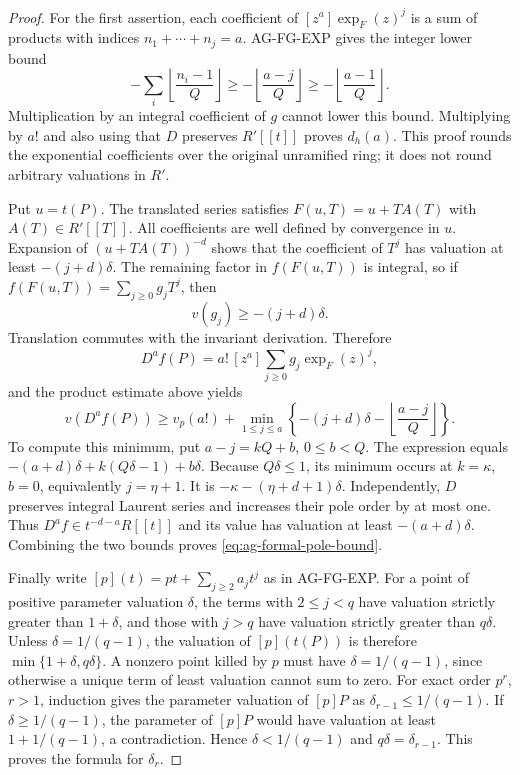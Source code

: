 \documentclass[11pt,a4paper]{article}
\begin{document}
\begin{proof}
For the first assertion, each coefficient of $[z^a]\exp_F(z)^j$
is a sum of products with indices $n_1+\cdots+n_j=a$.
AG-FG-EXP gives the integer lower bound
\[
 -\sum_i\left\lfloor\frac{n_i-1}{Q}\right\rfloor
 \ge-\left\lfloor\frac{a-j}{Q}\right\rfloor
 \ge-\left\lfloor\frac{a-1}{Q}\right\rfloor.
\]
Multiplication by an integral coefficient of $g$ cannot lower
this bound. Multiplying by $a!$ and also using that $D$ preserves
$R'[[t]]$ proves $d_h(a)$. This proof rounds the exponential
coefficients over the original unramified ring; it does not round
arbitrary valuations in $R'$.

Put $u=t(P)$. The translated series satisfies
$F(u,T)=u+T A(T)$ with $A(T)\in R'[[T]]$.
All coefficients are well defined by convergence in $u$.
Expansion of $(u+TA(T))^{-d}$ shows that the coefficient of
$T^j$ has valuation at least $-(j+d)\delta$.
The remaining factor in $f(F(u,T))$ is integral, so if
$f(F(u,T))=\sum_{j\ge0}g_jT^j$, then
\[
 v(g_j)\ge-(j+d)\delta.
\]
Translation commutes with the invariant derivation. Therefore
\[
 D^af(P)=a!\,[z^a]\sum_{j\ge0}g_j\exp_F(z)^j,
\]
and the product estimate above yields
\[
 v(D^af(P))\ge v_p(a!)+
   \min_{1\le j\le a}
       \left\{-(j+d)\delta-
           \left\lfloor\frac{a-j}{Q}\right\rfloor\right\}.
\]
To compute this minimum, put $a-j=kQ+b$, $0\le b<Q$.
The expression equals
$-(a+d)\delta+k(Q\delta-1)+b\delta$.
Because $Q\delta\le1$, its minimum occurs at
$k=\kappa$, $b=0$, equivalently $j=\eta+1$.
It is $-\kappa-(\eta+d+1)\delta$.
Independently, $D$ preserves integral Laurent series and
increases their pole order by at most one. Thus
$D^af\in t^{-d-a}R[[t]]$ and its value has valuation at least
$-(a+d)\delta$. Combining the two bounds proves
\eqref{eq:ag-formal-pole-bound}.

Finally write
$[p](t)=pt+\sum_{j\ge2}a_jt^j$ as in AG-FG-EXP.
For a point of positive parameter valuation $\delta$, the
terms with $2\le j<q$ have valuation strictly greater than
$1+\delta$, and those with $j>q$ have valuation strictly
greater than $q\delta$. Unless $\delta=1/(q-1)$, the
valuation of $[p](t(P))$ is therefore
$\min\{1+\delta,q\delta\}$. A nonzero point killed by
$p$ must have $\delta=1/(q-1)$, since otherwise a unique
term of least valuation cannot sum to zero.
For exact order $p^r$, $r>1$, induction gives the parameter
valuation of $[p]P$ as $\delta_{r-1}\le1/(q-1)$.
If $\delta\ge1/(q-1)$, the parameter of $[p]P$ would have
valuation at least $1+1/(q-1)$, a contradiction.
Hence $\delta<1/(q-1)$ and $q\delta=\delta_{r-1}$.
This proves the formula for $\delta_r$.
\end{proof}
\end{document}
